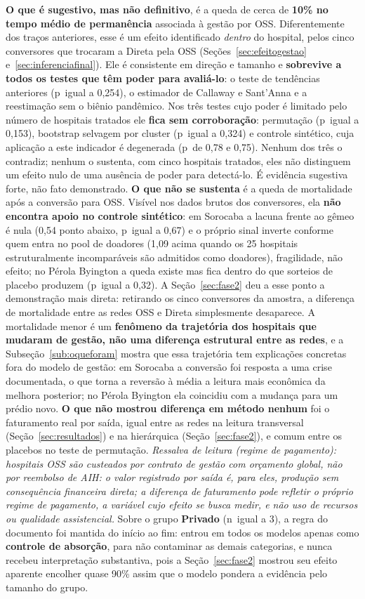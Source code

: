 \newpage
\textbf{O que é sugestivo, mas não definitivo}, é a queda de cerca de
\textbf{10\% no tempo médio de permanência} associada à gestão por OSS.
Diferentemente dos traços anteriores, esse é um efeito identificado
\emph{dentro} do hospital, pelos cinco conversores que trocaram a
Direta pela OSS (Seções~\ref{sec:efeitogestao}
e~\ref{sec:inferenciafinal}). Ele é consistente em direção e tamanho e
\textbf{sobrevive a todos os testes que têm poder para avaliá-lo}: o
teste de tendências anteriores (p~igual a 0,254), o estimador de
Callaway e Sant'Anna e a reestimação sem o biênio pandêmico. Nos três
testes cujo poder é limitado pelo número de hospitais tratados ele
\textbf{fica sem corroboração}: permutação (p~igual a 0,153), bootstrap
selvagem por cluster (p~igual a 0,324) e controle sintético, cuja
aplicação a este indicador é degenerada (p~de 0,78 e 0,75). Nenhum dos
três o contradiz; nenhum o sustenta, com cinco hospitais tratados,
eles não distinguem um efeito nulo de uma ausência de poder para
detectá-lo. É evidência sugestiva forte, não fato demonstrado. \textbf{O que
não se sustenta} é a queda de mortalidade após a conversão para OSS.
Visível nos dados brutos dos conversores, ela \textbf{não encontra
apoio no controle sintético}: em Sorocaba a lacuna frente ao gêmeo é
nula (0,54 ponto abaixo, p~igual a 0,67) e o próprio sinal inverte
conforme quem entra no pool de doadores (1,09 acima quando os 25
hospitais estruturalmente incomparáveis são admitidos como doadores),
fragilidade, não efeito; no Pérola Byington a queda existe mas
fica dentro do que sorteios de placebo produzem (p~igual a 0,32). A
Seção~\ref{sec:fase2} deu a esse ponto a demonstração mais direta:
retirando os cinco conversores da amostra, a diferença de mortalidade
entre as redes OSS e Direta simplesmente desaparece. A mortalidade
menor é um \textbf{fenômeno da trajetória dos hospitais que mudaram de
gestão, não uma diferença estrutural entre as redes}, e a
Subseção~\ref{sub:oqueforam} mostra que essa trajetória tem explicações
concretas fora do modelo de gestão: em Sorocaba a conversão foi resposta
a uma crise documentada, o que torna a reversão à média a leitura mais
econômica da melhora posterior; no Pérola Byington ela coincidiu com a
mudança para um prédio novo. \textbf{O que não
mostrou diferença em método nenhum} foi o faturamento real por saída, igual
entre as redes na leitura transversal (Seção~\ref{sec:resultados}) e na
hierárquica (Seção~\ref{sec:fase2}), e comum entre os placebos no teste
de permutação. \textit{Ressalva de leitura (regime de pagamento): hospitais OSS são custeados por contrato de gestão com orçamento global, não por reembolso de AIH: o valor registrado por saída é, para eles, produção sem consequência financeira direta; a diferença de faturamento pode refletir o próprio regime de pagamento, a variável cujo efeito se busca medir, e não uso de recursos ou qualidade assistencial.} Sobre o grupo \textbf{Privado} (n~igual a 3), a regra do
documento foi mantida do início ao fim: entrou em todos os modelos
apenas como \textbf{controle de absorção}, para não contaminar as
demais categorias, e nunca recebeu interpretação substantiva, pois a
Seção~\ref{sec:fase2} mostrou seu efeito aparente encolher quase 90\%
assim que o modelo pondera a evidência pelo tamanho do grupo.

